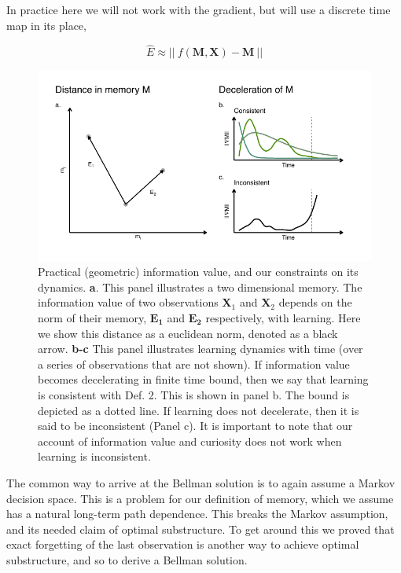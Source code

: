 In practice here we will not work with the gradient, but will use a discrete time map in its place,

\begin{equation}
	\label{eq:E_norm_discrete}
	\hat E \approx || \ f(\mathbf{M},\mathbf{X}) - \mathbf{M} \ ||
\end{equation}

\begin{figure}
	\includegraphics[width=1\linewidth]{img/cartoon.pdf} 
	\caption{Practical (geometric) information value, and our constraints on its dynamics. 
	\textbf{a}. This panel illustrates a two dimensional memory. The information value of two observations $\mathbf{X}_1$ and $\mathbf{X}_2$ depends on the norm of their memory, $\mathbf{E_1}$ and $\mathbf{E_2}$ respectively, with learning. Here we show this distance as a euclidean norm, denoted as a black arrow.
	\textbf{b-c} This panel illustrates learning dynamics with time (over a series of observations that are not shown). If information value becomes decelerating in finite time bound, then we say that learning is consistent with Def. 2. This is shown in panel b. The bound is depicted as a dotted line. If learning does not decelerate, then it is said to be inconsistent (Panel c). It is important to note that our account of information value and curiosity does not work when learning is inconsistent.
  	}
	\label{fig:cartoon} 
\end{figure}

The common way to arrive at the Bellman solution is to again assume a Markov decision space. This is a problem for our definition of memory, which we assume has a natural long-term path dependence. This breaks the Markov assumption, and its needed claim of optimal substructure. To get around this we proved that exact forgetting of the last observation is another way to achieve optimal substructure, and so to derive a Bellman solution.

